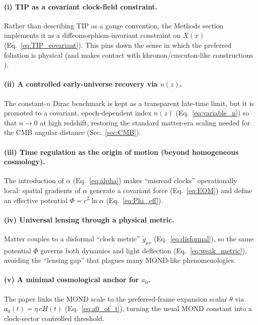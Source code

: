 \documentclass[12pt]{article}
\newcommand{\alphaReg}{\alpha}
\begin{document}
\paragraph{(i) TIP as a covariant clock-field constraint.}
Rather than describing TIP as a gauge convention, the Methods section implements it as a
diffeomorphism-invariant constraint on $X(x)$ (Eq.~\eqref{eq:TIP_covariant}). This pins down the sense in which the preferred
foliation is physical (and makes contact with khronon/cuscuton-like constructions \citep{JacobsonMattingly2001,Afshordi2007}).

\paragraph{(ii) A controlled early-universe recovery via $n(z)$.}
The constant-$n$ Dirac benchmark is kept as a transparent late-time limit, but it is promoted to a covariant,
epoch-dependent index $n(z)$ (Eq.~\eqref{eq:variable_n}) so that $n\to 0$ at high redshift, restoring the standard
matter-era scaling needed for the CMB angular distance (Sec.~\ref{sec:CMB}).

\paragraph{(iii) Time regulation as the origin of motion (beyond homogeneous cosmology).}
The introduction of $\alphaReg$ (Eq.~\eqref{eq:alpha}) makes ``misread clocks'' operationally local:
spatial gradients of $\alphaReg$ generate a covariant force (Eq.~\eqref{eq:EOM}) and define an effective potential
$\Phi=c^{2}\ln\alphaReg$ (Eq.~\eqref{eq:Phi_eff}).

\paragraph{(iv) Universal lensing through a physical metric.}
Matter couples to a disformal ``clock metric'' $\tilde g_{\mu\nu}$ (Eq.~\eqref{eq:disformal}), so the same potential $\Phi$
governs both dynamics and light deflection (Eq.~\eqref{eq:weak_metric}), avoiding the ``lensing gap'' that plagues
many MOND-like phenomenologies.

\paragraph{(v) A minimal cosmological anchor for $a_{0}$.}
The paper links the MOND scale to the preferred-frame expansion scalar $\theta$ via $a_{0}(t)=\eta\,cH(t)$
(Eq.~\eqref{eq:a0_of_t}), turning the usual MOND constant into a clock-sector controlled threshold.
\end{document}
